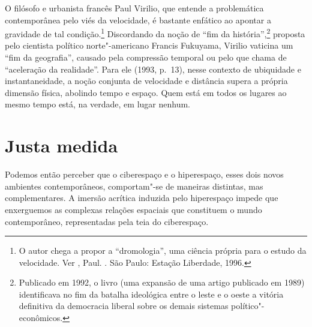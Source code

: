 O filósofo e urbanista francês Paul Virilio, que entende a problemática
contemporânea pelo viés da velocidade, é bastante enfático ao apontar a
gravidade de tal condição.\footnote{O autor chega a propor a
  ``dromologia'', uma ciência própria para o estudo da velocidade. Ver
  , Paul. {}. São Paulo: Estação
  Liberdade, 1996.} Discordando da noção de ``fim da
história'',\footnote{Publicado em 1992, o livro {} (uma expansão de uma artigo publicado em 1989)
  identificava no fim da batalha ideológica entre o leste e o oeste a
  vitória definitiva da democracia liberal sobre os demais sistemas
  político"-econômicos.} proposta pelo cientista político norte"-americano
Francis Fukuyama, Virilio vaticina um ``fim da geografia'', causado pela
compressão temporal ou pelo que chama de ``aceleração da realidade''.
Para ele (1993, p.~13), nesse contexto de ubiquidade e
instantaneidade, a noção conjunta de velocidade e distância supera a
própria dimensão física, abolindo tempo e espaço. Quem está em todos os lugares ao mesmo tempo está, na verdade, em lugar nenhum.

\chapter{Justa medida}

Podemos então perceber que o ciberespaço e o hiperespaço, esses dois
novos ambientes contemporâneos, comportam"-se de maneiras distintas, mas
complementares. A imersão acrítica induzida pelo hiperespaço impede que
enxerguemos as complexas relações espaciais que constituem o mundo
contemporâneo, representadas pela teia do ciberespaço.

